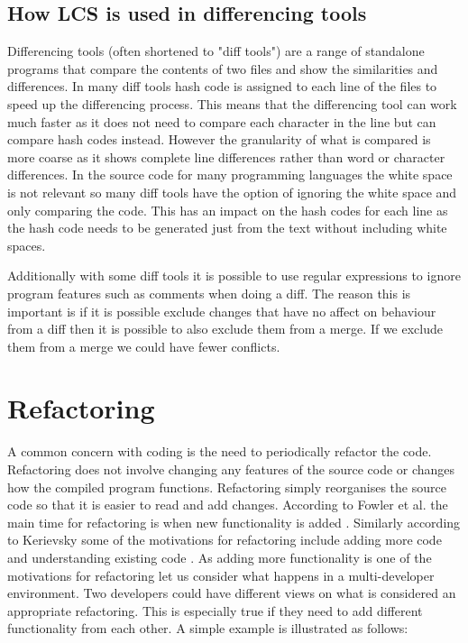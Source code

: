 \subsection{How LCS is used in differencing tools}
Differencing tools (often shortened to "diff tools") are a range of standalone programs that compare the contents of two files and show the similarities and differences.
In many diff tools hash code is assigned to each line of the files to speed up the differencing process.
This means that the differencing tool can work much faster as it does not need to compare each character in the line but can compare hash codes instead.
However the granularity of what is compared is more coarse as it shows complete line differences rather than word or character differences. 
In the source code for many programming languages the white space is not relevant so many diff tools have the option of ignoring the white space and only comparing the code.
This has an impact on the hash codes for each line as the hash code needs to be generated just from the text without including white spaces.

Additionally with some diff tools it is possible to use regular expressions to ignore program features such as comments when doing a diff.  The reason this is important is if it is possible exclude changes that have no affect on behaviour from a diff then it is possible to also exclude them from a merge.  If we exclude them from a merge we could have fewer conflicts.

 

\section{Refactoring}

A common concern with coding is the need to periodically refactor the code. Refactoring does not involve changing any features of the source code or changes how the compiled program functions. Refactoring simply reorganises the source code so that it is easier to read and add changes. According to Fowler et al. the main time for refactoring is when new functionality is added \cite{Fowler1999}. Similarly according to Kerievsky some of the motivations for refactoring include adding more code and understanding existing code \cite{Kerievsky2004}. As adding more functionality is one of the motivations for refactoring let us consider what happens in a multi-developer environment. Two developers could have different views on what is considered an appropriate refactoring. This is especially true if they need to add different functionality from each other. 
A simple example is illustrated as follows:


